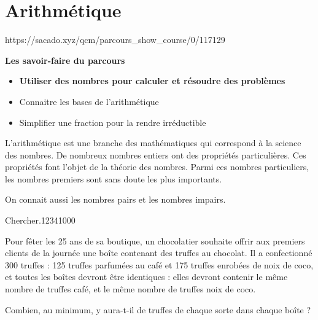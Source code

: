 \chapter{Arithmétique}
{https://sacado.xyz/qcm/parcours_show_course/0/117129}
{


 \begin{CpsCol}
\textbf{Les savoir-faire du parcours}
 \begin{itemize}
 \item \textbf{Utiliser des nombres pour calculer et résoudre des problèmes}
 \item Connaitre les bases de l'arithmétique
 \item Simplifier une fraction pour la rendre irréductible
 \end{itemize}
 \end{CpsCol}

\begin{His}

  
L'arithmétique est une branche des mathématiques qui correspond à la science des nombres. De nombreux nombres entiers ont des propriétés particulières. Ces propriétés font l'objet de la théorie des nombres. Parmi ces nombres particuliers, les nombres premiers sont sans doute les plus importants.

On connait aussi les nombres pairs et les nombres impairs. 

\end{His}

 

\begin{ExoDec}{Chercher.}{1234}{1}{0}{0}{0}

Pour fêter les 25 ans de sa boutique, un chocolatier souhaite offrir aux premiers clients de la journée une boîte contenant des truffes au chocolat.
Il a confectionné 300 truffes : 125 truffes parfumées au café et 175 truffes enrobées de noix de coco, et toutes les boîtes devront être identiques : elles
devront contenir le même nombre de truffes café, et le même nombre
de truffes noix de coco.

Combien, au minimum,  y aura-t-il de truffes de chaque sorte dans chaque boîte ?
 
\end{ExoDec}



}


